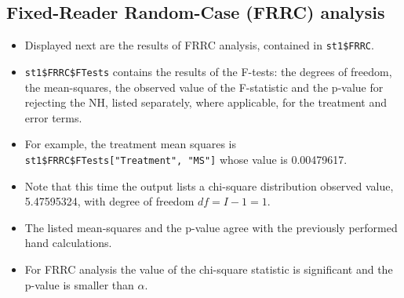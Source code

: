 \documentclass[
]{book}
\newenvironment{Shaded}{\begin{snugshade}}{\end{snugshade}}
\newcommand{\CommentTok}[1]{\textcolor[rgb]{0.56,0.35,0.01}{\textit{#1}}}
\newcommand{\DataTypeTok}[1]{\textcolor[rgb]{0.13,0.29,0.53}{#1}}
\newcommand{\DecValTok}[1]{\textcolor[rgb]{0.00,0.00,0.81}{#1}}
\newcommand{\KeywordTok}[1]{\textcolor[rgb]{0.13,0.29,0.53}{\textbf{#1}}}
\newcommand{\NormalTok}[1]{#1}
\newcommand{\OperatorTok}[1]{\textcolor[rgb]{0.81,0.36,0.00}{\textbf{#1}}}
\providecommand{\tightlist}{%
  \setlength{\itemsep}{0pt}\setlength{\parskip}{0pt}}
\begin{document}
\hypertarget{ORApplications-FRRC-dataset02-RJafroc}{%
\subsection{Fixed-Reader Random-Case (FRRC) analysis}\label{ORApplications-FRRC-dataset02-RJafroc}}

\begin{itemize}
\tightlist
\item
  Displayed next are the results of FRRC analysis, contained in \texttt{st1\$FRRC}.
\item
  \texttt{st1\$FRRC\$FTests} contains the results of the F-tests: the degrees of freedom, the mean-squares, the observed value of the F-statistic and the p-value for rejecting the NH, listed separately, where applicable, for the treatment and error terms.
\item
  For example, the treatment mean squares is \texttt{st1\$FRRC\$FTests{[}"Treatment",\ "MS"{]}} whose value is 0.00479617.
\end{itemize}

\begin{Shaded}
\end{Shaded}

\begin{itemize}
\tightlist
\item
  Note that this time the output lists a chi-square distribution observed value, 5.47595324, with degree of freedom \(df = I -1 = 1\).
\item
  The listed mean-squares and the p-value agree with the previously performed hand calculations.
\item
  For FRRC analysis the value of the chi-square statistic is significant and the p-value is smaller than \(\alpha\).
\end{itemize}

\begin{Shaded}
\end{Shaded}
\end{document}
